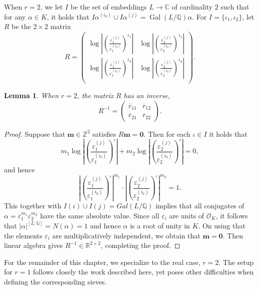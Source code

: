 \documentclass[11pt]{report}
\newtheorem{lemma}[theorem]{Lemma}
\theoremstyle{definition}
\DeclareMathOperator{\Gal}{Gal}
\newcommand{\eps}{\varepsilon}
\begin{document}
When $r = 2$, we let $I$ be the set of embeddings $L \to \mathbb{C}$ of cardinality $2$ such that for any $\alpha \in K$, it holds that $I\alpha^{(i_0)} \cup I\alpha^{(j)} = \Gal(L/\mathbb{Q})\alpha$. For $I = \{\iota_1, \iota_2\}$, let $R$ be the $2 \times 2$ matrix
\[R = \begin{pmatrix}
	\log\left|\left(\frac{\varepsilon_1^{(j)}}{\varepsilon_1^{(i_0)}}\right)^{\iota_1}\right| &
	\log\left|\left(\frac{\varepsilon_2^{(j)}}{\varepsilon_2^{(i_0)}}\right)^{\iota_1}\right|\\
	\log\left|\left(\frac{\varepsilon_1^{(j)}}{\varepsilon_1^{(i_0)}}\right)^{\iota_2}\right| &
	\log\left|\left(\frac{\varepsilon_2^{(j)}}{\varepsilon_2^{(i_0)}}\right)^{\iota_2}\right|\\
	\end{pmatrix}.\]
\begin{lemma}
When $r = 2$, the matrix $R$ has an inverse,
\[R^{-1} = \begin{pmatrix}
	\overline{r}_{11} & \overline{r}_{12} \\
	\overline{r}_{21} & \overline{r}_{22}
\end{pmatrix}.\]
\end{lemma}

\begin{proof}
Suppose that $\mathbf{m}\in\mathbb{Z}^{2}$ satisfies $R\mathbf{m}=\mathbf{0}$. Then for each $\iota\in I$ it holds that
\[m_{1} \log\left|\left(\frac{\varepsilon_1^{(j)}}{\varepsilon_1^{(i_0)}}\right)^{\iota}\right| + m_{2} \log\left|\left(\frac{\varepsilon_2^{(j)}}{\varepsilon_2^{(i_0)}}\right)^{\iota}\right| =0,\] and hence
\[\left|\left(\frac{\varepsilon_1^{(j)}}{\varepsilon_1^{(i_0)}}\right)^{\iota}\right|^{m_1}\cdot\left|\left(\frac{\varepsilon_2^{(j)}}{\varepsilon_2^{(i_0)}}\right)^{\iota}\right|^{m_2}=1.\]
This together with $I(i)\cup I(j)=Gal(L/\mathbb{Q})$ implies that all conjugates of $\alpha=\eps_1^{m_1}\eps_2^{m_2}$ have the same absolute value. Since all $\eps_i$ are units of $\mathcal{O}_K$, it follows that $|\alpha|^{[L:\mathbb{Q}]}=N(\alpha)=1$ and hence $\alpha$ is a root of unity in $K$. On using that  the elements $\eps_i$ are multiplicatively independent, we obtain that $\mathbf{m}=\mathbf{0}$.  Then linear algebra gives $R^{-1}\in\mathbb{R}^{2\times 2}$, completing the proof.
\end{proof}

For the remainder of this chapter, we specialize to the real case, $r = 2$. The setup for $r = 1$ follows closely the work described here, yet poses other difficulties when defining the corresponding sieves.
\end{document}
